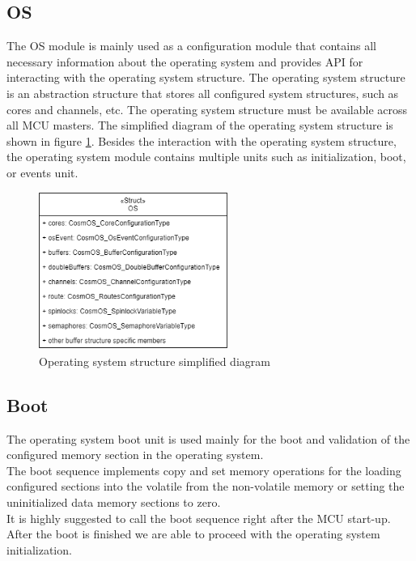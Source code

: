 \subsection{OS}
The OS module is mainly used as a configuration module that contains all necessary information about the operating system and provides \ac{API} for interacting with the operating system structure. The operating system structure is an abstraction structure that stores all configured system structures, such as cores and channels, etc. The operating system structure must be available across all \ac{MCU} masters. The simplified diagram of the operating system structure is shown in figure \ref{fig:osStructure}. Besides the interaction with the operating system structure, the operating system module contains multiple units such as initialization, boot, or events unit.

\begin{figure}[H]
\begin{center}
\includegraphics[width=0.55\textwidth]{images/os_structure.png}
\caption{Operating system structure simplified diagram}
\label{fig:osStructure}
\end{center}
\end{figure}

\subsection{Boot}
The operating system boot unit is used mainly for the boot and validation of the configured memory section in the operating system. \\
\indent The boot sequence implements copy and set memory operations for the loading configured sections into the volatile from the non-volatile memory or setting the uninitialized data memory sections to zero. \\
\indent It is highly suggested to call the boot sequence right after the \ac{MCU} start-up. \\
\indent After the boot is finished we are able to proceed with the operating system initialization.

